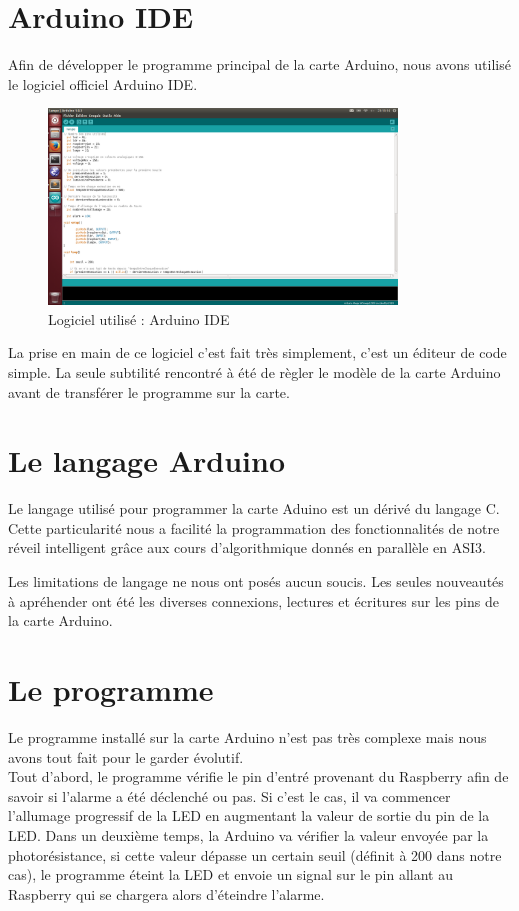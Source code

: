 \section{Arduino IDE}
	Afin de développer le programme principal de la carte Arduino, nous avons utilisé le logiciel officiel Arduino IDE.
	\begin{figure}[H]
		\centering
		\includegraphics[width=350px]{images/electronique/arduinoIDE.png}
		\caption{Logiciel utilisé : Arduino IDE}
	\end{figure}

	La prise en main de ce logiciel c'est fait très simplement, c'est un éditeur de code simple. La seule subtilité rencontré à été de règler le modèle de la carte Arduino avant de transférer le programme sur la carte.

\section{Le langage Arduino}
	Le langage utilisé pour programmer la carte Aduino est un dérivé du langage C. Cette particularité nous a facilité la programmation des fonctionnalités de notre réveil intelligent grâce aux cours d'algorithmique donnés en parallèle en ASI3.

	Les limitations de langage ne nous ont posés aucun soucis. Les seules nouveautés à apréhender ont été les diverses connexions, lectures et écritures sur les pins de la carte Arduino.

\section{Le programme}
	Le programme installé sur la carte Arduino n'est pas très complexe mais nous avons tout fait pour le garder évolutif.\\

	Tout d'abord, le programme vérifie le pin d'entré provenant du Raspberry afin de savoir si l'alarme a été déclenché ou pas. Si c'est le cas, il va commencer l'allumage progressif de la LED en augmentant la valeur de sortie du pin de la LED. Dans un deuxième temps, la Arduino va vérifier la valeur envoyée par la photorésistance, si cette valeur dépasse un certain seuil (définit à 200 dans notre cas), le programme éteint la LED et envoie un signal sur le pin allant au Raspberry qui se chargera alors d'éteindre l'alarme.\\

